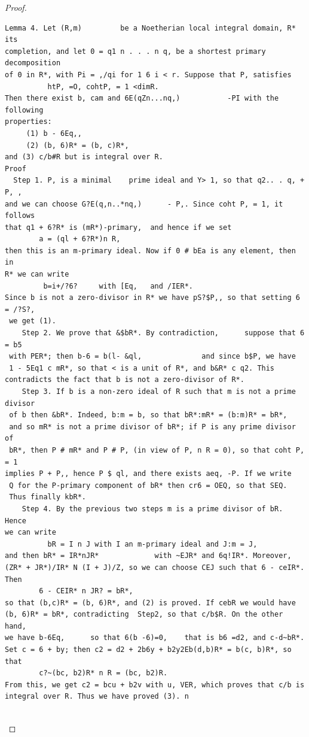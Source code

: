 \begin{proof}
\begin{verbatim}
Lemma 4. Let (R,m)         be a Noetherian local integral domain, R* its
completion, and let 0 = q1 n . . . n q, be a shortest primary decomposition
of 0 in R*, with Pi = ,/qi for 1 6 i < r. Suppose that P, satisfies
          htP, =O, cohtP, = 1 <dimR.
Then there exist b, cam and 6E(qZn...nq,)           -PI with the following
properties:
     (1) b - 6Eq,,
     (2) (b, 6)R* = (b, c)R*,
and (3) c/b#R but is integral over R.
Proof
  Step 1. P, is a minimal    prime ideal and Y> 1, so that q2.. . q, + P, ,
and we can choose G?E(q,n..*nq,)      - P,. Since coht P, = 1, it follows
that q1 + 6?R* is (mR*)-primary,  and hence if we set
        a = (ql + 6?R*)n R,
then this is an m-primary ideal. Now if 0 # bEa is any element, then in
R* we can write
         b=i+/?6?     with [Eq,   and /IER*.
Since b is not a zero-divisor in R* we have pS?$P,, so that setting 6 = /?S?,
 we get (1).
    Step 2. We prove that &$bR*. By contradiction,      suppose that 6 = b5
 with PER*; then b-6 = b(l- &ql,              and since b$P, we have
 1 - 5Eq1 c mR*, so that < is a unit of R*, and b&R* c q2. This
contradicts the fact that b is not a zero-divisor of R*.
    Step 3. If b is a non-zero ideal of R such that m is not a prime divisor
 of b then &bR*. Indeed, b:m = b, so that bR*:mR* = (b:m)R* = bR*,
 and so mR* is not a prime divisor of bR*; if P is any prime divisor of
 bR*, then P # mR* and P # P, (in view of P, n R = 0), so that coht P, = 1
implies P + P,, hence P $ ql, and there exists aeq, -P. If we write
 Q for the P-primary component of bR* then cr6 = OEQ, so that SEQ.
 Thus finally kbR*.
    Step 4. By the previous two steps m is a prime divisor of bR. Hence
we can write
          bR = I n J with I an m-primary ideal and J:m = J,
and then bR* = IR*nJR*             with ~EJR* and 6q!IR*. Moreover,
(ZR* + JR*)/IR* N (I + J)/Z, so we can choose CEJ such that 6 - ceIR*.
Then
        6 - CEIR* n JR? = bR*,
so that (b,c)R* = (b, 6)R*, and (2) is proved. If cebR we would have
(b, 6)R* = bR*, contradicting  Step2, so that c/b$R. On the other hand,
we have b-6Eq,      so that 6(b -6)=0,    that is b6 =d2, and c-d~bR*.
Set c = 6 + by; then c2 = d2 + 2b6y + b2y2Eb(d,b)R* = b(c, b)R*, so that
        c?~(bc, b2)R* n R = (bc, b2)R.
From this, we get c2 = bcu + b2v with u, VER, which proves that c/b is
integral over R. Thus we have proved (3). n


\end{verbatim}
\end{proof}
